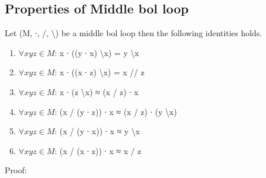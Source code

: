 \subsection{Properties of Middle bol loop}
Let (M, ∙, /, \textbackslash ) be a middle bol loop then the following
identities holds.
\begin{enumerate}
\item \(\forall x y z \in M\): x ∙ ((y ∙ x) \textbackslash x) = y \textbackslash x 
\item \(\forall x y z \in M\): x ∙ ((x ∙ z) \textbackslash x) = x // z
\item \(\forall x y z \in M\): x ∙ (z \textbackslash x) ≈ (x / z) ∙ x
\item \(\forall x y z \in M\): (x / (y ∙ z)) ∙ x ≈ (x / z) ∙ (y \textbackslash x)
\item \(\forall x y z \in M\): (x / (y ∙ x)) ∙ x ≈ y \textbackslash x
\item \(\forall x y z \in M\): (x / (x ∙ z)) ∙ x ≈ x / z
\end{enumerate}
Proof:
